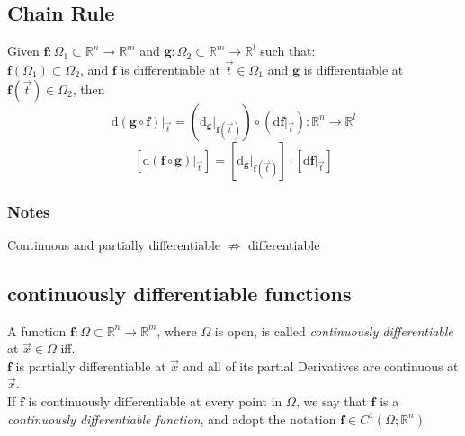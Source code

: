 \documentclass[11pt, a4paper]{article}
\begin{document}
   \subsection{Chain Rule}
   Given $\bm{f}: \Omega_1 \subset \mathbb{R}^n \to \mathbb{R}^m$ and $\bm{g}: \Omega_2 \subset \mathbb{R}^m \to \mathbb{R}^l$ such that: \\
   $\bm{f}(\Omega_1) \subset \Omega_2$, and $\bm{f}$ is differentiable at $\vec{t} \in \Omega_1$ and $\bm{g}$ is differentiable at $\bm{f}(\vec{t})\in \Omega_2$, then
   $$\mathrm{d}(\bm{g} \circ \bm{f})|_{\vec{t}} = (\mathrm{d}_{\bm{g}}|_{\bm{f}(\vec{t})}) \circ (\mathrm{d}\bm{f}|_{\vec{t}}): \mathbb{R}^n \to \mathbb{R}^l$$
   $$[\mathrm{d}(\bm{f} \circ \bm{g})|_{\vec{t}}] = [\mathrm{d}_{\bm{g}}|_{\bm{f}(\vec{t})}] \cdot [\mathrm{d}\bm{f}|_{\vec{t}}]$$
   \subsubsection{Notes}
   Continuous and partially differentiable $\nRightarrow$ differentiable \\
   \subsection{continuously differentiable functions}
   A function $\bm{f}: \Omega \subset \mathbb{R}^n \to \mathbb{R}^m$, where $\Omega$ is open, is called \textit{continuously differentiable} at $\vec{x} \in \Omega$ iff. \\
   $\bm{f}$ is partially differentiable at $\vec{x}$ and all of its partial Derivatives are continuous at $\vec{x}$. \\
   If $\bm{f}$ is continuously differentiable at every point in $\Omega$, we say that $\bm{f}$ is a \textit{continuously differentiable function}, and adopt the notation $\bm{f} \in C^1(\Omega; \mathbb{R}^n)$
\end{document}
